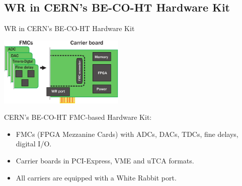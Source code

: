 \documentclass[compress,red]{beamer}
\begin{document}
\subsection{WR in CERN's BE-CO-HT Hardware Kit}
\begin{frame}{WR in CERN's BE-CO-HT Hardware Kit}
\begin{center}

  \includegraphics[width=6cm]{../../figures/node/shw_kit}

  \begin{block}{CERN's BE-CO-HT FMC-based Hardware Kit:}
    \begin{itemize}
    \item FMCs (FPGA Mezzanine Cards) with ADCs, DACs, TDCs, fine delays, digital I/O.
    \item Carrier boards in PCI-Express, VME and uTCA formats.
    \item All carriers are equipped with a White Rabbit port.
    \end{itemize}
  \end{block}

\end{center}
\end{frame}


\end{document}
